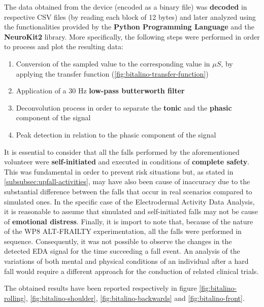 The data obtained from the device (encoded as a binary file) was \textbf{decoded} in respective CSV files (by reading each block of 12 bytes) and later analyzed using the functionalities provided by the \textbf{Python Programming Language} and the \textbf{NeuroKit2} \cite{neurokit} library. More specifically, the following steps were performed in order to process and plot the resulting data:

\begin{enumerate}
    \item Conversion of the sampled value to the corresponding value in $\mu S$, by applying the transfer function (\ref{fig:bitalino-transfer-function})
    \item Application of a 30 Hz \textbf{low-pass butterworth filter} 
    \item Deconvolution process in order to separate the \textbf{tonic} and the \textbf{phasic} component of the signal
    \item Peak detection in relation to the phasic component of the signal
\end{enumerate}

It is essential to consider that all the falls performed by the aforementioned volunteer were \textbf{self-initiated} and executed in conditions of \textbf{complete safety}. This was fundamental in order to prevent risk situations but, as stated in \ref{subsubsec:upfall-activities}, may have also been cause of inaccuracy due to the substantial difference between the falls that occur in real scenarios compared to simulated ones. In the specific case of the Electrodermal Activity Data Analysis, it is reasonable to assume that simulated and self-initiated falls may not be cause of \textbf{emotional distress}. Finally, it is import to note that, because of the nature of the WP8 ALT-FRAILTY experimentation, all the falls were performed in sequence. Consequently, it was not possible to observe the changes in the detected EDA signal for the time succeeding a fall event. An analysis of the variations of both mental and physical conditions of an individual after a hard fall would require a different approach for the conduction of related clinical trials. 

The obtained results have been reported respectively in figure \ref{fig:bitalino-rolling}, \ref{fig:bitalino-shoulder}, \ref{fig:bitalino-backwards} and \ref{fig:bitalino-front}.

